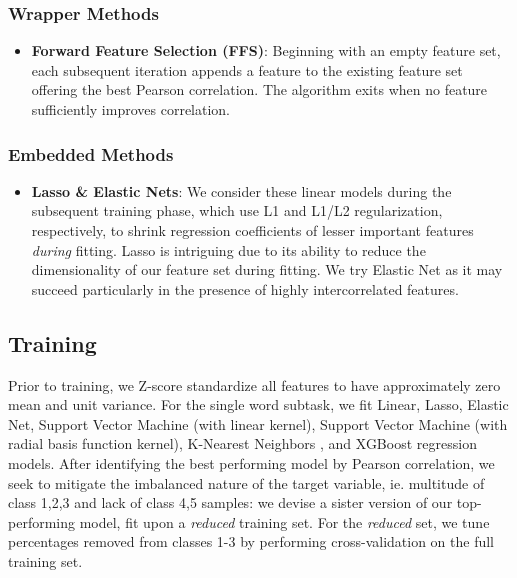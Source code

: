 \documentclass{dcthesis}
\theoremstyle{definition}
\theoremstyle{remark}
\begin{document}
\subsubsection{Wrapper Methods}

\begin{itemize}
  \item \textbf{Forward Feature Selection (FFS)}: Beginning with an empty feature set, each subsequent iteration appends a feature to the existing feature set offering the best Pearson correlation. The algorithm exits when no feature sufficiently improves correlation.
\end{itemize}

\subsubsection{Embedded Methods}
\begin{itemize}
  \item \textbf{Lasso \& Elastic Nets}: We consider these linear models during the subsequent training phase, which use L1 and L1/L2 regularization, respectively, to shrink regression coefficients of lesser important features \textit{during} fitting. Lasso \citep{tibshirani1996regression} is intriguing due to its ability to reduce the dimensionality of our feature set during fitting. We try Elastic Net \citep{zou2005regularization} as it may succeed particularly in the presence of highly intercorrelated features.
\end{itemize}

\subsection{Training}

Prior to training, we Z-score standardize all features to have approximately zero mean and unit variance. For the single word subtask, we fit Linear, Lasso, Elastic Net, Support Vector Machine \citep{platt1999probabilistic} (with linear kernel), Support Vector Machine (with radial basis function kernel), K-Nearest Neighbors \citep{wiki:K-nearest_neighbors_algorithm}, and XGBoost \citep{chen2016xgboost} regression models. After identifying the best performing model by Pearson correlation, we seek to mitigate the imbalanced nature of the target variable, ie. multitude of class 1,2,3 and lack of class 4,5 samples: we devise a sister version of our top-performing model, fit upon a \textit{reduced} training set. For the \textit{reduced} set, we tune percentages removed from classes 1-3 by performing cross-validation on the full  training set.
\end{document}
